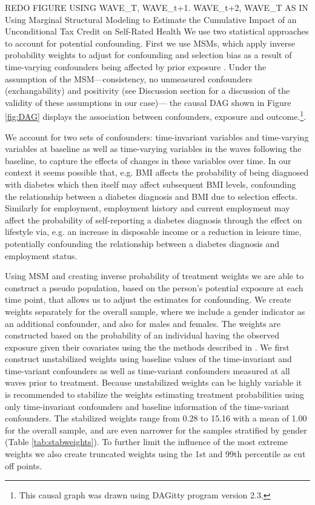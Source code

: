 REDO FIGURE USING WAVE\_T, WAVE\_t+1. WAVE\_t+2, WAVE\_T AS IN Using Marginal Structural Modeling to Estimate the Cumulative Impact of an Unconditional Tax Credit on Self-Rated Health
We use two statistical approaches to account for potential confounding. First we use \acp{MSM}, which apply inverse probability weights to adjust for confounding and selection bias as a result of time-varying confounders being affected by prior exposure \autocite{Robins2000}. Under the assumption of the \ac{MSM}\autocite{Robins2000}---consistency, no unmeasured confounders (exchangability) and positivity (see Discussion section for a discussion of the validity of these assumptions in our case)--- the causal DAG shown in Figure \ref{fig:DAG} displays the association between confounders, exposure and outcome.\footnote{This causal graph was drawn using DAGitty program version 2.3.\autocite{Textor2011}}. 

We account for two sets of confounders: time-invariant variables and time-varying variables at baseline as well as time-varying variables in the waves following the baseline, to capture the effects of changes in these variables over time. In our context it seems possible that, e.g. \ac{BMI} affects the probability of being diagnosed with diabetes which then itself may affect subsequent \ac{BMI} levels, confounding the relationship between a diabetes diagnosis and \ac{BMI} due to selection effects. Similarly for employment, employment history and current employment may affect the probability of self-reporting a diabetes diagnosis through the effect on lifestyle via, e.g. an increase in disposable income or a reduction in leisure time, potentially confounding the relationship between a diabetes diagnosis and employment status. 

Using \ac{MSM} and creating inverse probability of treatment weights we are able to construct a pseudo population, based on the person's potential exposure at each time point, that allows us to adjust the estimates for confounding. We create weights separately for the overall sample, where we include a gender indicator as an additional confounder, and also for males and females. The weights are constructed based on the probability of an individual having the observed exposure given their covariates using the the methods described in \textcite{Cole2008}\autocite{Cole2008}. We first construct unstabilized weights using baseline values of the time-invariant and time-variant confounders as well as time-variant confounders measured at all waves prior to treatment. Because unstabilized weights can be highly variable it is recommended to stabilize the weights estimating treatment probabilities using only time-invariant confounders and baseline information of the time-variant confounders. The stabilized weights range from 0.28 to 15.16 with a mean of 1.00 for the overall sample, and are even narrower for the samples stratified by gender (Table \ref{tab:stabweights}). To further limit the influence of the most extreme weights we also create truncated weights using the 1st and 99th percentile as cut off points.

